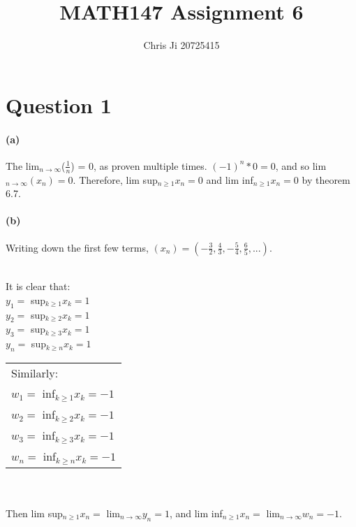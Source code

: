\documentclass[10pt,letter]{article}
\begin{document}
\title{MATH147 Assignment 6}
\author{Chris Ji 20725415}

\maketitle 

\section*{Question 1}

\paragraph{(a)} The lim$_{n\rightarrow\infty}$($\frac{1}{n}$) = 0, as proven multiple times. $(-1)^n * 0 = 0$, and so lim$_{n\rightarrow\infty}(x_n) = 0$. Therefore, lim sup$_{n\geq 1}x_n = 0$ and lim inf$_{n\geq 1}x_n = 0$ by theorem 6.7.

\paragraph{(b)} Writing down the first few terms, $(x_n) = (-\frac{3}{2}, \frac{4}{3}, -\frac{5}{4}, \frac{6}{5}, ...)$. \\ \\ 
\begin{minipage}{0.45\textwidth}
It is clear that: \\ 
$y_1 =$ sup$_{k\geq1}x_k = 1$\\
$y_2 =$ sup$_{k\geq2}x_k = 1$\\ 
$y_3 =$ sup$_{k\geq3}x_k = 1$\\
$y_n =$ sup$_{k\geq n}x_k = 1$\\
\end{minipage}
\begin{minipage}{0.45\textwidth}
\begin{tabular}{|p{\textwidth}}
Similarly:\\
$w_1 =$ inf$_{k\geq1}x_k = -1$\\ 
$w_2 =$ inf$_{k\geq2}x_k = -1$\\ 
$w_3 =$ inf$_{k\geq3}x_k = -1$\\
$w_n =$ inf$_{k\geq n}x_k = -1$\\
\end{tabular}
\end{minipage}
\\ \\ 
Then lim sup$_{n\geq 1}x_n =$ lim$_{n\rightarrow\infty} y_n = 1$, and  lim inf$_{n\geq 1}x_n =$ lim$_{n\rightarrow\infty} w_n = -1$.
\end{document}
